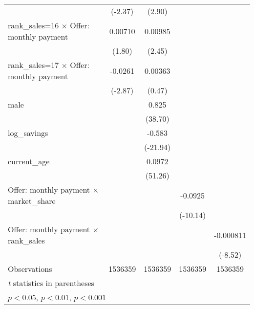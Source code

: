 {\begin{tabular}{l*{4}{c}}
                    &     (-2.37)         &      (2.90)         &                     &                     \\
rank\_sales=16 $\times$ Offer: monthly payment&     0.00710         &     0.00985\sym{*}  &                     &                     \\
                    &      (1.80)         &      (2.45)         &                     &                     \\
rank\_sales=17 $\times$ Offer: monthly payment&     -0.0261\sym{**} &     0.00363         &                     &                     \\
                    &     (-2.87)         &      (0.47)         &                     &                     \\
male                &                     &       0.825\sym{***}&                     &                     \\
                    &                     &     (38.70)         &                     &                     \\
log\_savings         &                     &      -0.583\sym{***}&                     &                     \\
                    &                     &    (-21.94)         &                     &                     \\
current\_age         &                     &      0.0972\sym{***}&                     &                     \\
                    &                     &     (51.26)         &                     &                     \\
Offer: monthly payment $\times$ market\_share&                     &                     &     -0.0925\sym{***}&                     \\
                    &                     &                     &    (-10.14)         &                     \\
Offer: monthly payment $\times$ rank\_sales&                     &                     &                     &   -0.000811\sym{***}\\
                    &                     &                     &                     &     (-8.52)         \\
\hline
Observations        &     1536359         &     1536359         &     1536359         &     1536359         \\
\hline\hline
\multicolumn{5}{l}{\footnotesize \textit{t} statistics in parentheses}\\
\multicolumn{5}{l}{\footnotesize \sym{*} \(p<0.05\), \sym{**} \(p<0.01\), \sym{***} \(p<0.001\)}\\
\end{tabular}
}
